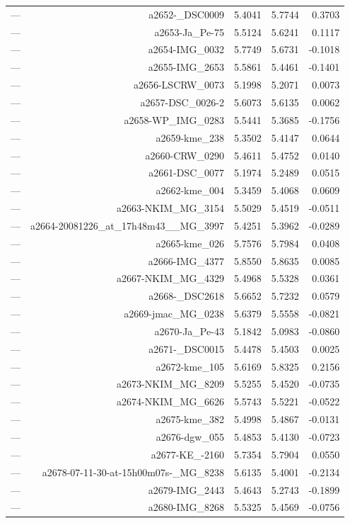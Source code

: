 \begin{table}[htbp]
\begin{tabular}{lrrrr}
— & a2652-_DSC0009 & 5.4041 & 5.7744 & 0.3703 \\
— & a2653-Ja_Pe-75 & 5.5124 & 5.6241 & 0.1117 \\
— & a2654-IMG_0032 & 5.7749 & 5.6731 & -0.1018 \\
— & a2655-IMG_2653 & 5.5861 & 5.4461 & -0.1401 \\
— & a2656-LSCRW_0073 & 5.1998 & 5.2071 & 0.0073 \\
— & a2657-DSC_0026-2 & 5.6073 & 5.6135 & 0.0062 \\
— & a2658-WP_IMG_0283 & 5.5441 & 5.3685 & -0.1756 \\
— & a2659-kme_238 & 5.3502 & 5.4147 & 0.0644 \\
— & a2660-CRW_0290 & 5.4611 & 5.4752 & 0.0140 \\
— & a2661-DSC_0077 & 5.1974 & 5.2489 & 0.0515 \\
— & a2662-kme_004 & 5.3459 & 5.4068 & 0.0609 \\
— & a2663-NKIM_MG_3154 & 5.5029 & 5.4519 & -0.0511 \\
— & a2664-20081226_at_17h48m43__MG_3997 & 5.4251 & 5.3962 & -0.0289 \\
— & a2665-kme_026 & 5.7576 & 5.7984 & 0.0408 \\
— & a2666-IMG_4377 & 5.8550 & 5.8635 & 0.0085 \\
— & a2667-NKIM_MG_4329 & 5.4968 & 5.5328 & 0.0361 \\
— & a2668-_DSC2618 & 5.6652 & 5.7232 & 0.0579 \\
— & a2669-jmac_MG_0238 & 5.6379 & 5.5558 & -0.0821 \\
— & a2670-Ja_Pe-43 & 5.1842 & 5.0983 & -0.0860 \\
— & a2671-_DSC0015 & 5.4478 & 5.4503 & 0.0025 \\
— & a2672-kme_105 & 5.6169 & 5.8325 & 0.2156 \\
— & a2673-NKIM_MG_8209 & 5.5255 & 5.4520 & -0.0735 \\
— & a2674-NKIM_MG_6626 & 5.5743 & 5.5221 & -0.0522 \\
— & a2675-kme_382 & 5.4998 & 5.4867 & -0.0131 \\
— & a2676-dgw_055 & 5.4853 & 5.4130 & -0.0723 \\
— & a2677-KE_-2160 & 5.7354 & 5.7904 & 0.0550 \\
— & a2678-07-11-30-at-15h00m07s-_MG_8238 & 5.6135 & 5.4001 & -0.2134 \\
— & a2679-IMG_2443 & 5.4643 & 5.2743 & -0.1899 \\
— & a2680-IMG_8268 & 5.5325 & 5.4569 & -0.0756 \\

\end{tabular}
\end{table}
